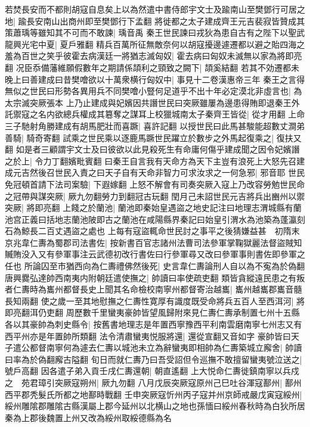 若焚長安而不都則胡寇自息矣上以為然遣中書侍郎宇文士及踰南山至樊鄧行可居之地|{
	踰長安南山出商州即至樊鄧行下孟翻}
將徙都之太子建成齊王元吉裴寂皆贊成其策蕭瑀等雖知其不可而不敢諫|{
	瑀音禹}
秦王世民諫曰戎狄為患自古有之陛下以聖武龍興光宅中夏|{
	夏戶雅翻}
精兵百萬所征無敵奈何以胡寇擾邊遽遷都以避之貽四海之羞為百世之笑乎彼霍去病漢廷一將猶志滅匈奴|{
	霍去病曰匈奴未滅無以家為將即亮翻}
况臣忝備藩維願假數年之期請係頡利之頸致之闕下|{
	頡奚結翻}
若其不効遷都未晚上曰善建成曰昔樊噲欲以十萬衆横行匈奴中|{
	事見十二卷漢惠帝三年}
秦王之言得無似之世民曰形勢各異用兵不同樊噲小豎何足道乎不出十年必定漠北非虛言也|{
	為太宗滅突厥張本}
上乃止建成與妃嬪因共譖世民曰突厥雖屢為邊患得賄即退秦王外託禦寇之名内欲總兵權成其簒奪之謀耳上校獵城南太子秦齊王皆從|{
	從才用翻}
上命三子馳射角勝建成有胡馬肥壯而喜蹶|{
	喜許記翻}
以授世民曰此馬甚駿能超數丈澗弟善騎|{
	騎奇寄翻}
試乘之世民乘以逐鹿馬蹶世民躍立於數步之外馬起復乘之|{
	復扶又翻}
如是者三顧謂宇文士及曰彼欲以此見殺死生有命庸何傷乎建成聞之因令妃嬪譖之於上|{
	令力丁翻嬪毗賓翻}
曰秦王自言我有天命方為天下主豈有浪死上大怒先召建成元吉然後召世民入責之曰天子自有天命非智力可求汝求之一何急邪|{
	邪音耶}
世民免冠頓首請下法司案驗|{
	下遐嫁翻}
上怒不解會有司奏突厥入寇上乃改容勞勉世民命之冠帶與謀突厥|{
	厥九勿翻勞力到翻冠古玩翻}
閏月己未詔世民元吉將兵出豳州以禦突厥|{
	將即亮翻}
上餞之於蘭池|{
	蘭池即秦始皇遇盜之地史記注曰地理志渭城縣有蘭池宫正義曰括地志蘭池陂即古之蘭池在咸陽縣界秦記曰始皇引渭水為池築為蓬瀛刻石為鯨長二百丈遇盜之處也}
上每有寇盜輒命世民討之事平之後猜嫌益甚　初隋末京兆韋仁夀為蜀郡司法書佐|{
	按新書百官志諸州法曹司法參軍掌鞠獄麗法督盜賊知贓賄没入又有參軍事注云武德初改行書佐曰行參軍尋又改曰參軍事則書佐即參軍之任也}
所論囚至市猶西向為仁夀禮佛然後死|{
	史言韋仁夀論刑人自以為不寃為於偽翻}
唐興爨弘達帥西南夷内附朝廷遣使撫之|{
	帥讀曰率使疏吏翻}
類皆貪縱遠民患之有叛者仁夀時為巂州都督長史上聞其名命檢校南寧州都督寄治越巂|{
	巂州越巂郡巂音髓長知兩翻}
使之歲一至其地慰撫之仁夀性寛厚有識度既受命將兵五百人至西洱河|{
	將即亮翻洱仍吏翻}
周歷數千里蠻夷豪帥皆望風歸附來見仁夀仁夀承制置七州十五縣各以其豪帥為刺史縣令|{
	按舊書地理志是年置西寧豫西平利南雲磨南寧七州志又有西平州亦是年置帥所類翻}
法令清肅蠻夷悦服將還|{
	還從宣翻又音如字}
豪帥皆曰天子遣公都督南寧何為遽去仁夀以城池未立為辭蠻夷即相帥為仁夀築城立廨舍|{
	帥讀曰率為於偽翻廨古隘翻}
旬日而就仁夀乃曰吾受詔但令巡撫不敢擅留蠻夷號泣送之|{
	號戶高翻}
因各遣子弟入貢壬戌仁夀還朝|{
	朝直遙翻}
上大悦命仁夀徙鎮南寧以兵戍之　苑君璋引突厥寇朔州|{
	厥九勿翻}
八月戊辰突厥寇原州己巳吐谷渾寇鄯州|{
	鄯州西平郡秃髮氏所都之地鄯時戰翻}
壬申突厥寇忻州丙子寇并州京師戒嚴戊寅寇綏州|{
	綏州雕隂郡雕隂古縣漢屬上郡今延州以北横山之地也孫愐曰綏州春秋時為白狄所居秦為上郡後魏置上州又改為綏州取綏德縣為名}
